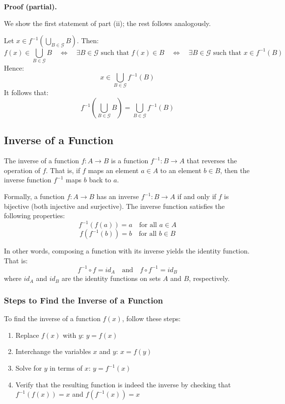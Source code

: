 \textbf{Proof (partial).}

We show the first statement of part (ii); the rest follows analogously.

Let \( x \in f^{-1} \left( \bigcup_{B \in \mathcal{G}} B \right) \). Then:
\[
	f(x) \in \bigcup_{B \in \mathcal{G}} B
	\quad \Leftrightarrow \quad
	\exists B \in \mathcal{G} \text{ such that } f(x) \in B
	\quad \Leftrightarrow \quad
	\exists B \in \mathcal{G} \text{ such that } x \in f^{-1}(B)
\]
Hence:
\[
	x \in \bigcup_{B \in \mathcal{G}} f^{-1}(B)
\]
It follows that:
\[
	f^{-1} \left( \bigcup_{B \in \mathcal{G}} B \right) = \bigcup_{B \in \mathcal{G}} f^{-1}(B)
\]


\subsection{Inverse of a Function}
The inverse of a function \(f: A \to B\) is a function \(f^{-1}: B \rightarrow A\) that reverses the operation of \(f\). That is, if \(f\) maps an element \(a \in A\) to an element \(b \in B\), then the inverse function \(f^{-1}\) maps \(b\) back to \(a\).

 Formally, a function \(f: A \to B\) has an inverse \(f^{-1}: B \rightarrow A\) if and only if \(f\) is bijective (both injective and surjective). The inverse function satisfies the following properties:
\[
	f^{-1}(f(a)) = a \quad \text{for all } a \in A
\]
\[
	f(f^{-1}(b)) = b \quad \text{for all } b \in B
\]

In other words, composing a function with its inverse yields the identity function. That is:
\[
	f^{-1} \circ f = id_A \quad \text{and} \quad f \circ f^{-1} = id_B
\]
where \(id_A\) and \(id_B\) are the identity functions on sets \(A\) and \(B\), respectively.

\subsubsection{Steps to Find the Inverse of a Function}
To find the inverse of a function \(f (x)\), follow these steps:
\begin{enumerate}
	\item Replace \(f (x)\) with \(y\): \(y = f (x)\)
	\item Interchange the variables \(x\) and \(y\): \(x = f (y)\)
	\item Solve for \(y\) in terms of \(x\): \(y = f^{-1} (x)\)
	\item Verify that the resulting function is indeed the inverse by checking that \(f^{-1}(f(x)) = x\) and \(f (f^{-1} (x)) = x\)
\end{enumerate}

